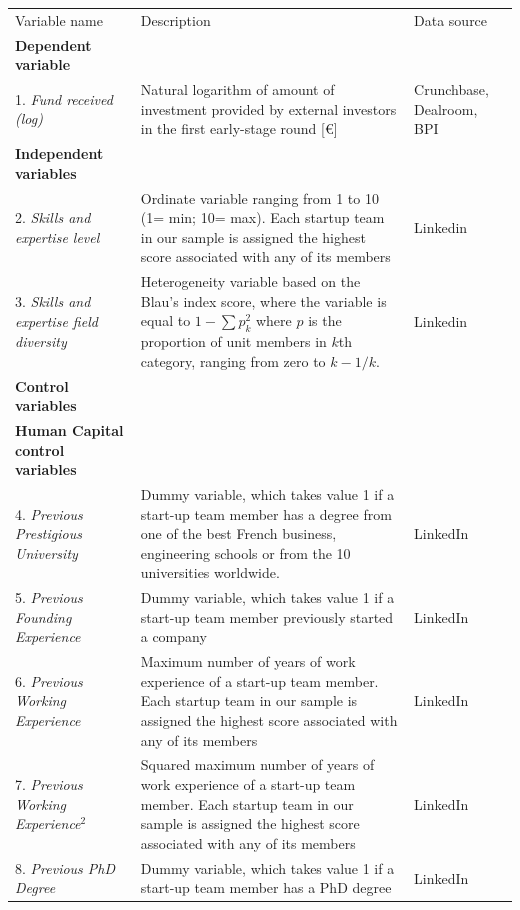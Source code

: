 \documentclass[12pt]{article}
\begin{document}
\begin{table} [ht]
\scriptsize
\renewcommand{\arraystretch}{1.5}
\begin{tabularx}{\textwidth}{ p{5cm} p{7cm} p{2.2cm} }
\toprule
\multicolumn{1}{l}{Variable name}&\multicolumn{1}{l}{Description}&\multicolumn{1}{l}{Data source}\\
\cmidrule(r){1-3}
\textbf{Dependent variable}& &\\
1. \textit{Fund received (log)} & Natural logarithm of amount of investment provided by external investors in the first early-stage round [€] & Crunchbase, Dealroom, BPI\\
\cmidrule(r){2-3}
\textbf{Independent variables}& &\\
2. \textit{Skills and expertise level} & Ordinate variable ranging from 1 to 10 (1= min; 10= max). Each startup team in our sample is assigned the highest score associated with any of its members & Linkedin\\
3. \textit{Skills and expertise field diversity} & Heterogeneity variable based on the Blau's index score, where the variable is equal to $1-\sum p_k^2$ where $p$ is the proportion of unit members in $k$th category, ranging from zero to $k-1/k$. & Linkedin\\
\cmidrule(r){2-3}
\textbf{Control variables}& &\\
\textbf{Human Capital control variables}& &\\
4. \textit{Previous Prestigious University} & Dummy variable, which takes value 1 if a start-up team member has a degree from one of the best French business, engineering schools or from the 10 universities worldwide. & LinkedIn\\
5. \textit{Previous Founding Experience} & Dummy variable, which takes value 1 if a start-up team member previously started a company & LinkedIn\\
6. \textit{Previous Working Experience} & Maximum number of years of work experience of a start-up team member. Each startup team in our sample is assigned the highest score associated with any of its members & LinkedIn\\
7. \textit{Previous Working Experience$^2$} & Squared maximum number of years of work experience of a start-up team member. Each startup team in our sample is assigned the highest score associated with any of its members & LinkedIn\\
8. \textit{Previous PhD Degree} & Dummy variable, which takes value 1 if a start-up team member has a PhD degree & LinkedIn\\

\end{tabularx}
\end{table}
\end{document}

